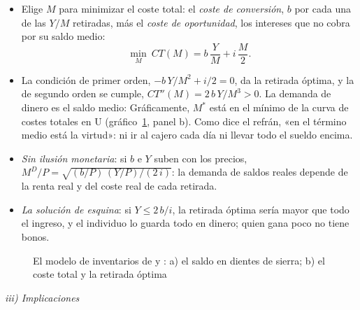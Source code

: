 \documentclass[11pt]{article}
\begin{document}
\begin{itemize}
\item Elige $M$ para minimizar el coste total: el \emph{coste de conversión}, $b$ por cada una de las $Y/M$ retiradas, más el \emph{coste de oportunidad}, los intereses que no cobra por su saldo medio:
  $$\min_{M}\ CT(M)=b\,\frac{Y}{M}+i\,\frac{M}{2}.$$
\item La condición de primer orden, $-b\,Y/M^2+i/2=0$, da la retirada óptima, y la de segundo orden se cumple, $CT''(M)=2\,b\,Y/M^3>0$. La demanda de dinero es el saldo medio:
  Gráficamente, $M^*$ está en el mínimo de la curva de costes totales en U (gráfico~\ref{fig:baumol-tobin}, panel b). Como dice el refrán, «en el término medio está la virtud»: ni ir al cajero cada día ni llevar todo el sueldo encima.
\item \emph{Sin ilusión monetaria}: si $b$ e $Y$ suben con los precios, $M^D/P=\sqrt{(b/P)\,(Y/P)/(2\,i)}$: la demanda de saldos reales depende de la renta real y del coste real de cada retirada.
\item \emph{La solución de esquina}: si $Y\leq 2\,b/i$, la retirada óptima sería mayor que todo el ingreso, y el individuo lo guarda todo en dinero; quien gana poco no tiene bonos\nocite{Tobin1956Interest}.
\end{itemize}

\begin{figure}[H]
\centering
\caption{El modelo de inventarios de  y : a) el saldo en dientes de sierra; b) el coste total y la retirada óptima}\label{fig:baumol-tobin}
\end{figure}

\hspace*{3.6em}\emph{iii) Implicaciones}
\end{document}
